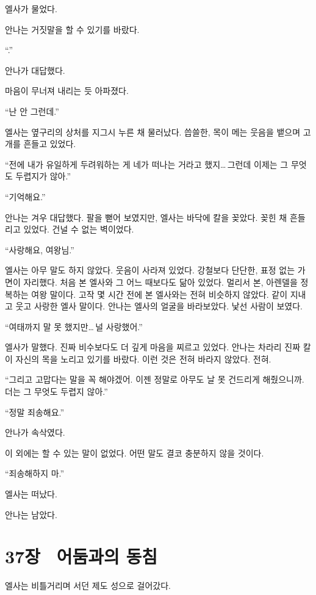 엘사가 물었다.

안나는 거짓말을 할 수 있기를 바랐다.

``.''

안나가 대답했다.

마음이 무너져 내리는 듯 아파졌다.

``난 안 그런데.''

엘사는 옆구리의 상처를 지그시 누른 채 물러났다. 씁쓸한, 목이 메는 웃음을 뱉으며 고개를 흔들고 있었다.

``전에 내가 유일하게 두려워하는 게 네가 떠나는 거라고 했지\ldots\,그런데 이제는 그 무엇도 두렵지가 않아.''

``기억해요.''

안나는 겨우 대답했다. 팔을 뻗어 보였지만, 엘사는 바닥에 칼을 꽂았다. 꽂힌 채 흔들리고 있었다. 건널 수 없는 벽이었다.

``사랑해요, 여왕님.''

엘사는 아무 말도 하지 않았다. 웃음이 사라져 있었다. 강철보다 단단한, 표정 없는 가면이 자리했다. 처음 본 엘사와 그 어느 때보다도 닮아 있었다. 멀리서 본, 아렌델을 정복하는 여왕 말이다. 고작 몇 시간 전에 본 엘사와는 전혀 비슷하지 않았다. 같이 지내고 웃고 사랑한 엘사 말이다. 안나는 엘사의 얼굴을 바라보았다. 낯선 사람이 보였다.

``여태까지 말 못 했지만\ldots\,널 사랑했어.''

엘사가 말했다. 진짜 비수보다도 더 깊게 마음을 찌르고 있었다. 안나는 차라리 진짜 칼이 자신의 목을 노리고 있기를 바랐다. 이런 것은 전혀 바라지 않았다. 전혀.

``그리고 고맙다는 말을 꼭 해야겠어. 이젠 정말로 아무도 날 못 건드리게 해줬으니까. 더는 그 무엇도 두렵지 않아.''

``정말 죄송해요.''

안나가 속삭였다.

이 외에는 할 수 있는 말이 없었다. 어떤 말도 결코 충분하지 않을 것이다.

``죄송해하지 마.''

엘사는 떠났다.

안나는 남았다.



\chapter[37장  어둠과의 동침][37장\hspace*{.5em}어둠과의 동침]{37장 \ 어둠과의 동침}



엘사는 비틀거리며 서던 제도 성으로 걸어갔다.

